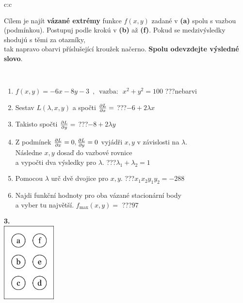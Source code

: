 \documentclass[10pt]{report}
\begin{document}
\begin{tabular}{c:c}
\begin{minipage}[c][104.5mm][t]{0.5\linewidth}
\begin{center}
\begin{minipage}{0.95\linewidth}
\begin{center}
Cílem je najít \textbf{vázané extrémy} funkce $f(x,y)$ zadané v \textbf{(a)} spolu s vazbou (podmínkou). Postupuj podle krokú v \textbf{(b)} až \textbf{(f)}. Pokud se medzivýsledky shodujú s těmi za otazníky,\\tak napravo obarvi příslušející kroužek načerno. \textbf{Spolu odevzdejte výsledné slovo}.
\end{center}
\end{minipage}
\\[1mm]
\begin{minipage}{0.79\linewidth}
\begin{center}
\begin{varwidth}{\linewidth}
\begin{enumerate}
\normalsize
\item $f(x,y)=-6x-8y-3 \enspace , \enspace \mathrm{vazba:} \enspace x^2+y^2=100$\quad \dotfill\; ???\;\dotfill \quad nebarvi
\item Sestav $L(\lambda,x,y)$ a spočti $\pdv{L}{x}=$\quad \dotfill\; ???\;\dotfill \quad $-6+2\lambda x$
\item Takisto spočti $\pdv{L}{y}=$\quad \dotfill\; ???\;\dotfill \quad $-8+2\lambda y$
\item Z podmínek $\pdv{L}{x}=0 , \pdv{L}{y}=0$ vyjádři $x,y$ v závislosti na $\lambda$.\\ \phantom{xxxxxx}Následne $x,y$ dosaď do vazbové rovnice\\ \phantom{xxxxxx}a vypočti dva výsledky pro $\lambda$.\quad \dotfill\; ???\;\dotfill \quad $\lambda_1+\lambda_2=1$
\item Pomocou $\lambda$ urč dvě dvojice pro $x,y$.\quad \dotfill\; ???\;\dotfill \quad $x_1 x_2 y_1 y_2=-288$
\item Najdi funkční hodnoty pro oba vázané stacionární body\\ \phantom{xxxxxx}a vyber tu najvětší. $f_{\text{max}}(x,y)=$\quad \dotfill\; ???\;\dotfill \quad $97$
\end{enumerate}
\end{varwidth}
\end{center}
\end{minipage}
\begin{minipage}{0.20\linewidth}
\begin{center}
{\Huge\bfseries 3.} \\[2mm]
\includegraphics[height=40mm]{../images/braille.png}

\end{center}
\end{minipage}
\end{center}
\end{minipage}
\end{tabular}
\end{document}
